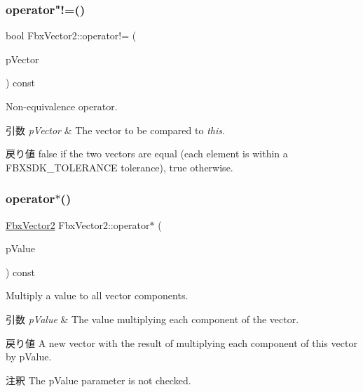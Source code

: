 \subsubsection{\texorpdfstring{operator"!=()}{operator!=()}}
{\footnotesize\ttfamily bool Fbx\+Vector2\+::operator!= (\begin{DoxyParamCaption}\item[{const \hyperlink{class_fbx_vector2}{Fbx\+Vector2} \&}]{p\+Vector }\end{DoxyParamCaption}) const}

Non-\/equivalence operator. 
\begin{DoxyParams}{引数}
{\em p\+Vector} & The vector to be compared to {\itshape this}. \\
\hline
\end{DoxyParams}
\begin{DoxyReturn}{戻り値}
{\ttfamily false} if the two vectors are equal (each element is within a F\+B\+X\+S\+D\+K\+\_\+\+T\+O\+L\+E\+R\+A\+N\+CE tolerance), {\ttfamily true} otherwise. 
\end{DoxyReturn}
\mbox{\label{class_fbx_vector2_aefff14b357c194d95d842ec09074d75d}} 
\subsubsection{\texorpdfstring{operator$\ast$()}{operator*()}\hspace{0.1cm}{\footnotesize\ttfamily [1/2]}}
{\footnotesize\ttfamily \hyperlink{class_fbx_vector2}{Fbx\+Vector2} Fbx\+Vector2\+::operator$\ast$ (\begin{DoxyParamCaption}\item[{double}]{p\+Value }\end{DoxyParamCaption}) const}

Multiply a value to all vector components. 
\begin{DoxyParams}{引数}
{\em p\+Value} & The value multiplying each component of the vector. \\
\hline
\end{DoxyParams}
\begin{DoxyReturn}{戻り値}
A new vector with the result of multiplying each component of this vector by p\+Value. 
\end{DoxyReturn}
\begin{DoxyRemark}{注釈}
The p\+Value parameter is not checked. 
\end{DoxyRemark}
\mbox{\label{class_fbx_vector2_a23e549f48d5149cab64d2704bc559662}} 
